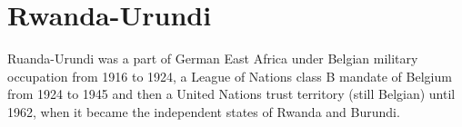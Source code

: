 \chapter{Rwanda-Urundi}  
Ruanda-Urundi was a part of German East Africa under Belgian military occupation from 1916 to 1924, a League of Nations class B mandate of Belgium from 1924 to 1945 and then a United Nations trust territory (still Belgian) until 1962, when it became the independent states of Rwanda and Burundi.


        